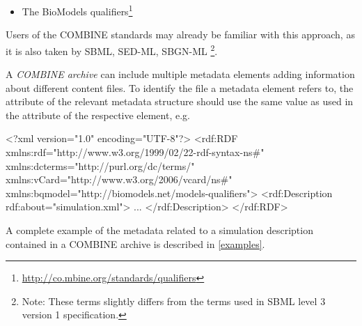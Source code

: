 \begin{itemize}
{	More information on the use of Dublin Core in RDF can be found 
	on the Dublin Core website{\footnote{\url{http://dublincore.org/documents/dc-rdf/}}}. 
	
	More informationabout the definition of the date format used within  and 
	 elements is available on the W3C website {\footnote{\url{http://www.w3.org/TR/NOTE-datetime}}}.
	}
\item {The BioModels qualifiers\footnote{\url{http://co.mbine.org/standards/qualifiers}}
}
\end{itemize}

Users of the COMBINE standards may already be familiar with this 
approach, as it is also taken by SBML, SED-ML, SBGN-ML \footnote{Note: These terms slightly differs
from the terms used in SBML level 3 version 1 specification.}.

A \textit{COMBINE archive} can include multiple metadata elements adding information about different content files. To 
identify the file a metadata element refers to, the  attribute of the relevant metadata structure should use the same value as used in the  attribute of the respective \Content element, e.g.

\begin{example}
<?xml version="1.0" encoding="UTF-8"?>
<rdf:RDF xmlns:rdf="http://www.w3.org/1999/02/22-rdf-syntax-ns#" 
         xmlns:dcterms="http://purl.org/dc/terms/" 
	 xmlns:vCard="http://www.w3.org/2006/vcard/ns#"
	 xmlns:bqmodel="http://biomodels.net/models-qualifiers">
   <rdf:Description rdf:about="simulation.xml">
   ...
	 </rdf:Description>
</rdf:RDF>
\end{example}

A complete example of the metadata related to a simulation description contained in a COMBINE archive is described in \ref{examples}. 


